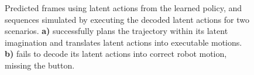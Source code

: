  


\begin{figure}[t]
	
	
	
	

	\vspace{-0.4cm}
	\caption{
		Predicted frames using latent actions from the learned policy, and sequences simulated by executing the decoded latent actions for two \ButtonPress{} scenarios.
		\textbf{a)} \Method{} successfully plans the trajectory within its latent imagination and translates latent actions into executable motions.
		\textbf{b)} \Method{} fails to decode its latent actions into correct robot motion, missing the button.
	}
	\label{fig: button beh 00}
\end{figure}